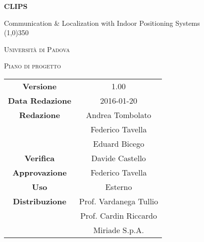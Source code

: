 \documentclass[a4paper,12pt]{article}
\author{Eduard Bicego, Federico Tavella, Andrea Tombolato}
\date{20/01/2016}
\begin{document}
	\begin{titlepage}
		\centering
		{\huge\bfseries CLIPS\par}
		Communication \& Localization with Indoor Positioning Systems \\
		\line(1,0){350} \\
		{\scshape\LARGE Università di Padova \par}
		\vspace{1cm}
		{\scshape\Large Piano di progetto\par}
		\logo
	
		\vfill \vfill
		\begin{tabular}{c|c}
			{\hfill \textbf{Versione}} 			& 1.00				\\
			{\hfill\textbf{Data Redazione}} 	& 2016-01-20 		\\
			{\hfill\textbf{Redazione}} 			& Andrea Tombolato  \\ 
												& Federico Tavella	\\
												& Eduard Bicego		\\
			{\hfill\textbf{Verifica}} 			& Davide Castello 	\\
			{\hfill\textbf{Approvazione}} 		& Federico Tavella	\\
			{\hfill\textbf{Uso}} 				& Esterno			\\
			{\hfill\textbf{Distribuzione}} 		& Prof. Vardanega Tullio \\
												& Prof. Cardin Riccardo \\
												& Miriade S.p.A. \\
	\end{tabular}
\end{titlepage}

	\pagestyle{myfront}	
	
	\newpage
			
	\newpage
		\tableofcontents 	%
	\newpage
		\listoftables 		%
	\newpage	
		\listoffigures		%
	
	\label{LastFrontPage}

	\newpage
		\pagestyle{mymain}
	
	\newpage
		
	\newpage
		

	\newpage
		
		
	\newpage
		
		
	\newpage
			
		
	\newpage
			

    \newpage
		
		
	\newpage
		
        
    \newpage
		
		
	\label{LastPage}
\end{document}
